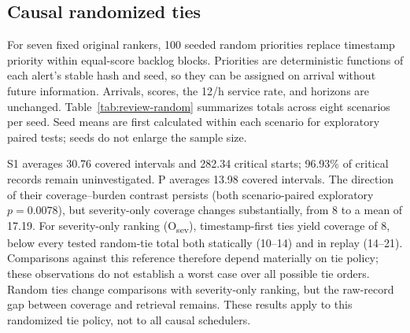 \subsection{Causal randomized ties}
For seven fixed original rankers, 100 seeded random priorities replace timestamp priority within equal-score backlog blocks. Priorities are deterministic functions of each alert's stable hash and seed, so they can be assigned on arrival without future information. Arrivals, scores, the 12/h service rate, and horizons are unchanged. Table~\ref{tab:review-random} summarizes totals across eight scenarios per seed. Seed means are first calculated within each scenario for exploratory paired tests; seeds do not enlarge the sample size.

S1\key{} averages 30.76 covered intervals and 282.34 critical starts; 96.93\% of critical records remain uninvestigated. P averages 13.98 covered intervals. The direction of their coverage--burden contrast persists (both scenario-paired exploratory $p=0.0078$), but severity-only coverage changes substantially, from 8 to a mean of 17.19. For severity-only ranking (O\textsubscript{sev}), timestamp-first ties yield coverage of 8, below every tested random-tie total both statically (10--14) and in replay (14--21). Comparisons against this reference therefore depend materially on tie policy; these observations do not establish a worst case over all possible tie orders. Random ties change comparisons with severity-only ranking, but the raw-record gap between coverage and retrieval remains. These results apply to this randomized tie policy, not to all causal schedulers.

\begin{tableorg}[htbp]
\centering\small
\caption{Raw-alert replay at 12/h: 11,508 starts per ranker and seed. FIFO ties uses timestamp-first ordering; remaining columns give random-tie means over 100 seed totals and coverage range (of 32). Before end counts first starts before the exclusive interval end. Online Resource~1, Section~S9 also reports noncritical interval-positive starts.}
\label{tab:review-random}
\resizebox{\textwidth}{!}{}
\end{tableorg}

